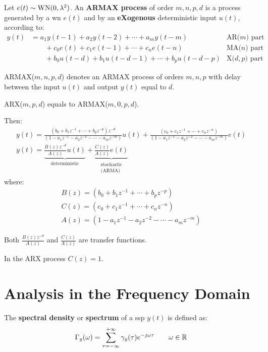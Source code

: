 \begin{defn}
	Let $e(t) \sim \operatorname{WN}(0, \lambda^{2})$. An \textbf{ARMAX process} of order $m,n,p,d$ is a process generated by a \gls{wn} $e(t)$ and by an \textbf{eXogenous} deterministic input $u(t)$, according to:
	\begin{equation*}
	   \boxed{
		   \begin{aligned}
				y(t)&=a_{1} y(t-1)+a_{2} y(t-2)+\cdots+a_{m} y(t-m) &\text{AR($m$) part}\\
				&\qquad+c_{0} e(t)+c_{1} e(t-1)+\cdots+c_{n} e(t-n) &\text{MA($n$) part} \\
				&\qquad+b_{0} u(t-d)+b_{1} u(t-d-1)+\cdots+b_{p} u(t-d-p)  &\text{X($d,p$) part}
			\end{aligned}
		}
	\end{equation*}
\end{defn}

ARMAX($m,n,p,d$) denotes an ARMAX process of orders $m,n,p$ with delay between the input $u(t)$ and output $y(t)$ equal to $d$.

ARX($m,p,d$) equals to ARMAX($m,0,p,d$).

Then:
\begin{gather*}
	y(t) = \frac{(b_{0}+b_{1} z^{-1}+\cdots+b_{p} z^{-p}) z^{-d}}{(1-a_{1} z^{-1}-a_{2} z^{-2}-\cdots-a_{m} z^{-m})} u(t)
	+ \frac{(c_{0}+c_{1} z^{-1}+\cdots+c_{n} z^{-n})}{(1-a_{1} z^{-1}-a_{2} z^{-2}-\cdots-a_{m} z^{-m})} e(t) \\
	\boxed{
		y(t) =
		\underbrace{\frac{B(z) z^{-d}}{A(z)} u(t)}_{\text{deterministic}}
		+\underbrace{\frac{C(z)}{A(z)} e(t)}_{\substack{\text{stochastic}\\ \text{(ARMA)}}}
	}
\end{gather*}
where:
\begin{gather*}
	\boxed{B(z) = \left(b_{0}+b_{1} z^{-1}+\cdots+b_{p} z^{-p}\right)}\\
	\boxed{C(z) = \left(c_{0}+c_{1} z^{-1}+\cdots+c_{n} z^{-n}\right)}\\
	\boxed{A(z) = \left(1-a_{1} z^{-1}-a_{2} z^{-2}-\cdots-a_{m} z^{-m}\right)}
\end{gather*}

Both $\frac{B(z) z^{-d}}{A(z)}$ and $\frac{C(z)}{A(z)}$ are transfer functions.

In the ARX process $C(z)=1$.

\chapter{Analysis in the Frequency Domain}
\begin{defn}
	The \textbf{spectral density} or \textbf{spectrum} of a \gls{ssp} $y(t)$ is defined as:
	\[
		\Gamma_{y}(\omega)=\sum_{\tau=-\infty}^{+\infty} \gamma_{y}(\tau) e^{-j \omega \tau} \qquad \omega \in \mathbb{R}
	\]
\end{defn}

